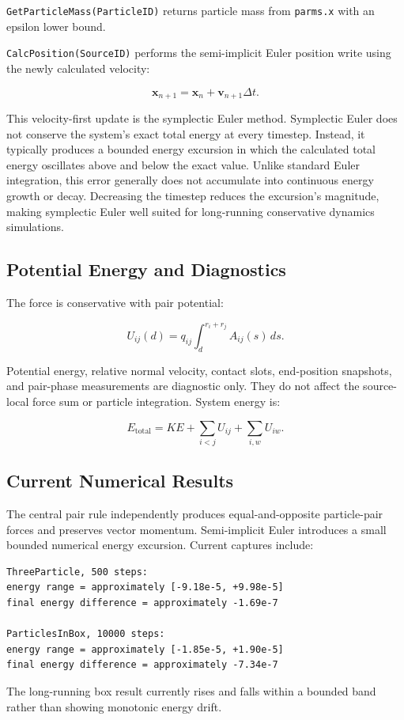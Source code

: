 
\texttt{GetParticleMass(ParticleID)} returns particle mass from
\texttt{parms.x} with an epsilon lower bound.


\texttt{CalcPosition(SourceID)} performs the semi-implicit Euler position
write using the newly calculated velocity:

\begin{equation}
\mathbf x_{n+1}
=
\mathbf x_n+\mathbf v_{n+1}\Delta t.
\end{equation}

This velocity-first update is the symplectic Euler method.  Symplectic Euler
does not conserve the system's exact total energy at every timestep.  Instead,
it typically produces a bounded energy excursion in which the calculated
total energy oscillates above and below the exact value.  Unlike standard
Euler integration, this error generally does not accumulate into continuous
energy growth or decay.  Decreasing the timestep reduces the excursion's
magnitude, making symplectic Euler well suited for long-running conservative
dynamics simulations.

\subsection{Potential Energy and Diagnostics}

The force is conservative with pair potential:

\begin{equation}
U_{ij}(d)=q_{ij}\int_d^{r_i+r_j}A_{ij}(s)\,ds.
\end{equation}

Potential energy, relative normal velocity, contact slots, end-position
snapshots, and pair-phase measurements are diagnostic only.  They do not
affect the source-local force sum or particle integration.  System energy is:

\begin{equation}
E_{\mathrm{total}}=KE+\sum_{i<j}U_{ij}+\sum_{i,w}U_{iw}.
\end{equation}

\subsection{Current Numerical Results}

The central pair rule independently produces equal-and-opposite particle-pair
forces and preserves vector momentum.  Semi-implicit Euler introduces a small
bounded numerical energy excursion.  Current captures include:

\begin{verbatim}
ThreeParticle, 500 steps:
energy range = approximately [-9.18e-5, +9.98e-5]
final energy difference = approximately -1.69e-7

ParticlesInBox, 10000 steps:
energy range = approximately [-1.85e-5, +1.90e-5]
final energy difference = approximately -7.34e-7
\end{verbatim}

The long-running box result currently rises and falls within a bounded band
rather than showing monotonic energy drift.

